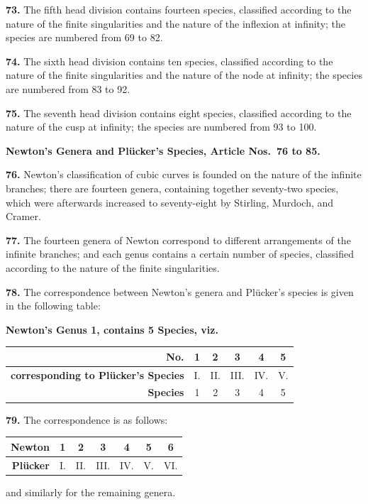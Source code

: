 \documentclass[11pt,a4paper]{article}
\theoremstyle{plain}
\theoremstyle{definition}
\begin{document}
\textbf{73.} The fifth head division contains fourteen species, classified according to the nature of the finite singularities and the nature of the inflexion at infinity; the species are numbered from 69 to 82.

\textbf{74.} The sixth head division contains ten species, classified according to the nature of the finite singularities and the nature of the node at infinity; the species are numbered from 83 to 92.

\textbf{75.} The seventh head division contains eight species, classified according to the nature of the cusp at infinity; the species are numbered from 93 to 100.

\bigskip

\noindent\textbf{Newton's Genera and Pl\"{u}cker's Species, Article Nos.~76 to 85.}

\medskip

\textbf{76.} Newton's classification of cubic curves is founded on the nature of the infinite branches; there are fourteen genera, containing together seventy-two species, which were afterwards increased to seventy-eight by Stirling, Murdoch, and Cramer.

\textbf{77.} The fourteen genera of Newton correspond to different arrangements of the infinite branches; and each genus contains a certain number of species, classified according to the nature of the finite singularities.

\textbf{78.} The correspondence between Newton's genera and Pl\"{u}cker's species is given in the following table:

\begin{center}
\small
\textbf{Newton's Genus 1, contains 5 Species, viz.} \\
\medskip
\begin{tabular}{@{}rccccc@{}}
\toprule
\textbf{No.} & 1 & 2 & 3 & 4 & 5 \\
\midrule
\textbf{corresponding to Pl\"{u}cker's Species} & I. & II. & III. & IV. & V. \\
\midrule
\textbf{Species} & 1 & 2 & 3 & 4 & 5 \\
\bottomrule
\end{tabular}
\end{center}

\textbf{79.} The correspondence is as follows:
\begin{center}
\small
\begin{tabular}{@{}rcccccc@{}}
\toprule
\textbf{Newton} & 1 & 2 & 3 & 4 & 5 & 6 \\
\midrule
\textbf{Pl\"{u}cker} & I. & II. & III. & IV. & V. & VI. \\
\bottomrule
\end{tabular}
\end{center}
and similarly for the remaining genera.
\end{document}
